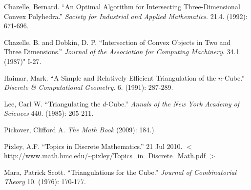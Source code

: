 \documentclass[12pt]{scrippsthesis}
\theoremstyle{definition}
\theoremstyle{remark}
\theoremstyle{plain}
\begin{document}
\begin{thebibliography}{Ma75}

 Chazelle, Bernard. ``An Optimal Algorithm for Intersecting Three-Dimensional
Convex Polyhedra.''  \emph{Society for Industrial and Applied Mathematics}.
21.4. (1992): 671-696. 

 Chazelle, B. and Dobkin, D. P. ``Intersection of Convex Objects in Two and Three Dimensions.''  \emph{Journal of the Association for Computing Machinery}. 34.1. (1987)" I-27. 


 Haimar, Mark. ``A Simple and Relatively Efficient Triangulation of the $n$-Cube.'' \emph{Discrete \& Computational Geometry}.  6. (1991): 287-289.

 Lee, Carl W. ``Triangulating the $d$-Cube.'' \emph{Annals of the New York Academy of Sciences} 440. (1985): 205-211.

 Pickover, Clifford A. \emph{The Math Book}  (2009): 184.)


 Pixley, A.F. ``Topics in Discrete Mathematics.'' 21 Jul 2010.
$<$\url{http://www.math.hmc.edu/~pixley/Topics_in_Discrete_Math.pdf} $>$


 Mara, Patrick Scott.  ``Triangulations for the Cube.''  \emph{Journal of Combinatorial Theory} 10. (1976): 170-177.





\end{thebibliography}
\end{document}
